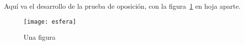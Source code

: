 \documentclass{oposicion}
\begin{document}
Aquí va el desarrollo de la prueba de oposición, con la
figura~\ref{fig:esfera} en hoja aparte.

\begin{figure}[p]
  \centering
  \texttt{[image: esfera]}
  \caption{Una figura}
  \label{fig:esfera}
\end{figure}
\end{document}
